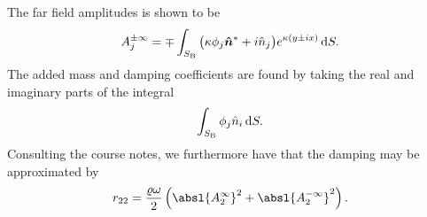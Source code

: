 The far field amplitudes is shown to be
\[
    A_j^{\pm \infty} = \mp \int_{S_{\mathrm{B}}} \big( \kappa \phi_j \bm{\hat{n}}^{\ast} + i\hat{n}_j \big) e^{\kappa(y \pm ix)} \,\mathrm{d} S.
\]
The added mass and damping coefficients are found by taking the real and imaginary parts of the integral
\[
    \int_{S_{\mathrm{B}}} \phi_j \hat{n}_i \,\mathrm{d} S.
\]
Consulting the course notes, we furthermore have that the damping may be approximated by
\[
    r_{22} = \frac{\varrho \omega}{2} \left( {\absl{A^{\infty}_{2}}}^2 + {\absl{A^{-\infty}_{2}}}^2 \right).
\]